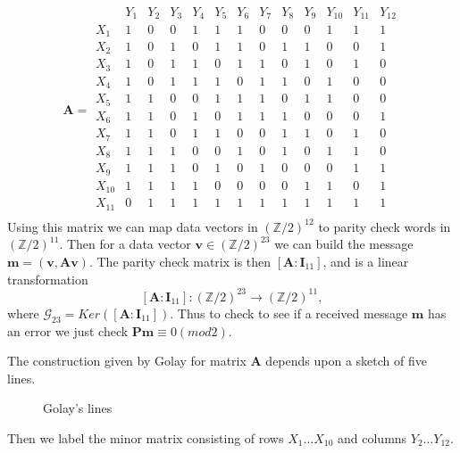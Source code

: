 \documentclass[paper=a4, fontsize=11pt]{scrartcl} %
\numberwithin{equation}{section} %
\numberwithin{figure}{section} %
\numberwithin{table}{section} %
\begin{document}
$$\textbf{A} = \begin{array}{ccccccccccccc}
& Y_1 & Y_2 & Y_3 & Y_4 & Y_5 & Y_6 & Y_7 & Y_8 & Y_9 & Y_{10} & Y_{11} & Y_{12} \\
   X_1 & 1 & 0 & 0 & 1 & 1 & 1 & 0 & 0 & 0 & 1 & 1 & 1\\
   X_2 & 1 & 0 & 1 & 0 & 1 & 1 & 0 & 1 & 1 & 0 & 0 & 1\\
   X_3 & 1 & 0 & 1 & 1 & 0 & 1 & 1 & 0 & 1 & 0 & 1 & 0\\
   X_4 & 1 & 0 & 1 & 1 & 1 & 0 & 1 & 1 & 0 & 1 & 0 & 0\\
   X_5 & 1 & 1 & 0 & 0 & 1 & 1 & 1 & 0 & 1 & 1 & 0 & 0\\
   X_6 & 1 & 1 & 0 & 1 & 0 & 1 & 1 & 1 & 0 & 0 & 0 & 1\\
   X_7 & 1 & 1 & 0 & 1 & 1 & 0 & 0 & 1 & 1 & 0 & 1 & 0\\
   X_8 & 1 & 1 & 1 & 0 & 0 & 1 & 0 & 1 & 0 & 1 & 1 & 0\\
   X_9 & 1 & 1 & 1 & 0 & 1 & 0 & 1 & 0 & 0 & 0 & 1 & 1\\
X_{10} & 1 & 1 & 1 & 1 & 0 & 0 & 0 & 0 & 1 & 1 & 0 & 1\\
X_{11} & 0 & 1 & 1 & 1 & 1 & 1 & 1 & 1 & 1 & 1 & 1 & 1\\
\end{array}$$
Using this matrix we can map data vectors in $(\mathbb{Z}/2)^{12}$ to parity check words in $(\mathbb{Z}/2)^{11}$. Then for a data vector $\mathbf{v} \in (\mathbb{Z}/2)^{23}$ we can build the message $\mathbf{m} = (\mathbf{v},\mathbf{A}\mathbf{v})$. The parity check matrix is then $[\mathbf{A}:\mathbf{I}_{11}]$, and is a linear transformation $$[\mathbf{A}:\mathbf{I}_{11}]: (\mathbb{Z}/2)^{23} \longrightarrow (\mathbb{Z}/2)^{11},$$ where $\mathcal{G}_{23}=Ker([\mathbf{A}:\mathbf{I}_{11}])$. Thus to check to see if a received message $\mathbf{m}$ has an error we just check $\mathbf{Pm} \equiv 0 (mod 2)$.

The construction given by Golay for matrix $\textbf{A}$ depends upon a sketch of five lines.

\begin{figure}[!ht]
  \centering
  \def\svgwidth{150pt}
    
  \caption{Golay's lines}
  \label{fig:cstori}
\end{figure}

Then we label the minor matrix consisting of rows $X_1 \ldots X_{10}$ and columns $Y_2 \ldots Y_{12}$.
\end{document}

